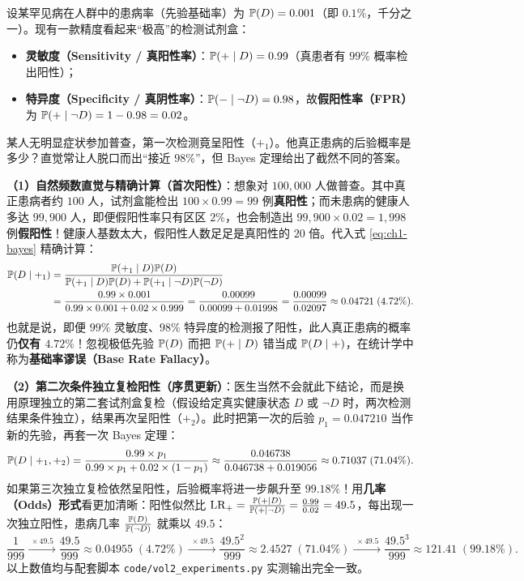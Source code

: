 \begin{example}[罕见病筛查中的基础率谬误与序贯二次复检]
\label{ex:ch1-rare-disease}
设某罕见病在人群中的患病率（先验基础率）为 $\mathbb{P}(D) = 0.001$（即 $0.1\%$，千分之一）。现有一款精度看起来“极高”的检测试剂盒：
\begin{itemize}
  \item \textbf{灵敏度（Sensitivity / 真阳性率）}：$\mathbb{P}(+\mid D) = 0.99$（真患者有 $99\%$ 概率检出阳性）；
  \item \textbf{特异度（Specificity / 真阴性率）}：$\mathbb{P}(-\mid \neg D) = 0.98$，故\textbf{假阳性率（FPR）}为 $\mathbb{P}(+\mid \neg D) = 1 - 0.98 = 0.02$。
\end{itemize}
某人无明显症状参加普查，第一次检测竟呈阳性（$+_1$）。他真正患病的后验概率是多少？直觉常让人脱口而出“接近 $98\%$”，但 Bayes 定理给出了截然不同的答案。

\textbf{（1）自然频数直觉与精确计算（首次阳性）}：想象对 $100{,}000$ 人做普查。其中真正患病者约 $100$ 人，试剂盒能检出 $100\times 0.99 = 99$ 例\textbf{真阳性}；而未患病的健康人多达 $99{,}900$ 人，即便假阳性率只有区区 $2\%$，也会制造出 $99{,}900\times 0.02 = 1{,}998$ 例\textbf{假阳性}！健康人基数太大，假阳性人数足足是真阳性的 $20$ 倍。代入式 \eqref{eq:ch1-bayes} 精确计算：
\begin{align*}
  \mathbb{P}(D \mid +_1)
  &= \frac{\mathbb{P}(+_1 \mid D)\mathbb{P}(D)}{\mathbb{P}(+_1 \mid D)\mathbb{P}(D) + \mathbb{P}(+_1 \mid \neg D)\mathbb{P}(\neg D)} \\
  &= \frac{0.99 \times 0.001}{0.99 \times 0.001 + 0.02 \times 0.999}
  = \frac{0.00099}{0.00099 + 0.01998}
  = \frac{0.00099}{0.02097} \approx 0.04721\;(4.72\%).
\end{align*}
也就是说，即便 $99\%$ 灵敏度、$98\%$ 特异度的检测报了阳性，此人真正患病的概率仍\textbf{仅有 $4.72\%$}！忽视极低先验 $\mathbb{P}(D)$ 而把 $\mathbb{P}(+\mid D)$ 错当成 $\mathbb{P}(D\mid +)$，在统计学中称为\textbf{基础率谬误（Base Rate Fallacy）}。

\textbf{（2）第二次条件独立复检阳性（序贯更新）}：医生当然不会就此下结论，而是换用原理独立的第二套试剂盒复检（假设给定真实健康状态 $D$ 或 $\neg D$ 时，两次检测结果条件独立），结果再次呈阳性（$+_2$）。此时把第一次的后验 $p_1 = 0.047210$ 当作新的先验，再套一次 Bayes 定理：
\[
  \mathbb{P}(D \mid +_1, +_2)
  = \frac{0.99 \times p_1}{0.99 \times p_1 + 0.02 \times (1 - p_1)}
  \approx \frac{0.046738}{0.046738 + 0.019056}
  \approx 0.71037\;(71.04\%).
\]
如果第三次独立复检依然呈阳性，后验概率将进一步飙升至 $99.18\%$！用\textbf{几率（Odds）形式}看更加清晰：阳性似然比 $\mathrm{LR}_+ = \frac{\mathbb{P}(+\mid D)}{\mathbb{P}(+\mid \neg D)} = \frac{0.99}{0.02} = 49.5$，每出现一次独立阳性，患病几率 $\frac{\mathbb{P}(D)}{\mathbb{P}(\neg D)}$ 就乘以 $49.5$：
\[
  \frac{1}{999} \xrightarrow{\;\times 49.5\;} \frac{49.5}{999} \approx 0.04955\;(4.72\%)
  \xrightarrow{\;\times 49.5\;} \frac{49.5^2}{999} \approx 2.4527\;(71.04\%)
  \xrightarrow{\;\times 49.5\;} \frac{49.5^3}{999} \approx 121.41\;(99.18\%).
\]
以上数值均与配套脚本 \texttt{code/vol2\_experiments.py} 实测输出完全一致。
\end{example}

